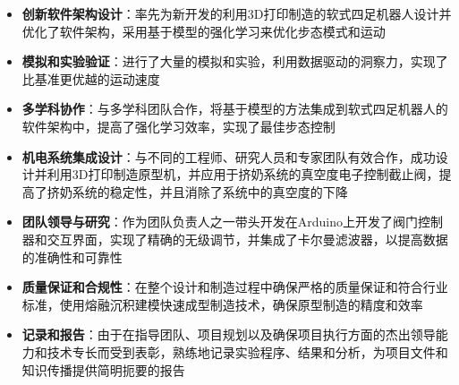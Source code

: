 



\begin{itemize}
\footnotesize 
  \item \textbf{创新软件架构设计}：率先为新开发的利用3D打印制造的软式四足机器人设计并优化了软件架构，采用基于模型的强化学习来优化步态模式和运动
  \item \textbf{模拟和实验验证}：进行了大量的模拟和实验，利用数据驱动的洞察力，实现了比基准更优越的运动速度
  \item \textbf{多学科协作}：与多学科团队合作，将基于模型的方法集成到软式四足机器人的软件架构中，提高了强化学习效率，实现了最佳步态控制
\end{itemize}

\begin{itemize}
\footnotesize 
  \item \textbf{机电系统集成设计}：与不同的工程师、研究人员和专家团队有效合作，成功设计并利用3D打印制造原型机，并应用于挤奶系统的真空度电子控制截止阀，提高了挤奶系统的稳定性，并且消除了系统中的真空度的下降
  \item \textbf{团队领导与研究}：作为团队负责人之一带头开发在Arduino上开发了阀门控制器和交互界面，实现了精确的无级调节，并集成了卡尔曼滤波器，以提高数据的准确性和可靠性
  \item \textbf{质量保证和合规性}：在整个设计和制造过程中确保严格的质量保证和符合行业标准，使用熔融沉积建模快速成型制造技术，确保原型制造的精度和效率
  \item \textbf{记录和报告}：由于在指导团队、项目规划以及确保项目执行方面的杰出领导能力和技术专长而受到表彰，熟练地记录实验程序、结果和分析，为项目文件和知识传播提供简明扼要的报告

\end{itemize}

